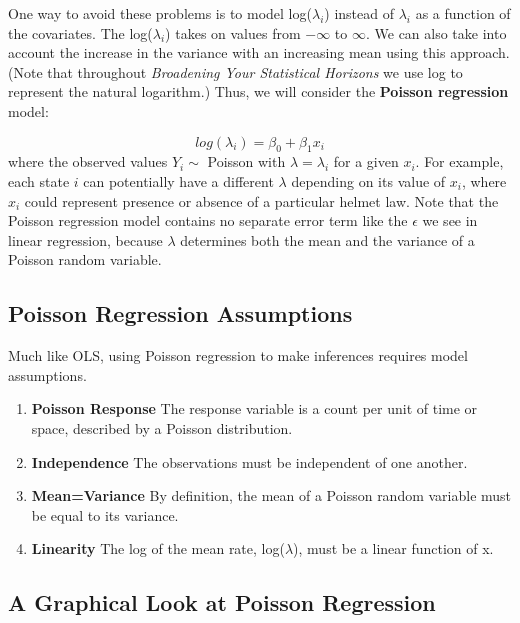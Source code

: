 \documentclass[
]{krantz}
\providecommand{\tightlist}{%
  \setlength{\itemsep}{0pt}\setlength{\parskip}{0pt}}
\begin{document}
One way to avoid these problems is to model log(\(\lambda_i\)) instead of \(\lambda_i\) as a function of the covariates. The log(\(\lambda_i\)) takes on values from \(-\infty\) to \(\infty\). We can also take into account the increase in the variance with an increasing mean using this approach. (Note that throughout \emph{Broadening Your Statistical Horizons} we use log to represent the natural logarithm.) Thus, we will consider the \textbf{Poisson regression} model:

\begin{equation}
log(\lambda_i)=\beta_0+\beta_1 x_i
\label{eq:poisReg}
\end{equation}
where the observed values \(Y_i \sim\) Poisson with \(\lambda=\lambda_i\) for a given \(x_i\). For example, each state \(i\) can potentially have a different \(\lambda\) depending on its value of \(x_i\), where \(x_i\) could represent presence or absence of a particular helmet law. Note that the Poisson regression model contains no separate error term like the \(\epsilon\) we see in linear regression, because \(\lambda\) determines both the mean and the variance of a Poisson random variable.

\hypertarget{poisson-regression-assumptions}{%
\subsection{Poisson Regression Assumptions}\label{poisson-regression-assumptions}}

Much like OLS, using Poisson regression to make inferences requires model assumptions.

\begin{enumerate}
\def\labelenumi{\arabic{enumi}.}
\tightlist
\item
  \textbf{Poisson Response} The response variable is a count per unit of time or space, described by a Poisson distribution.
\item
  \textbf{Independence} The observations must be independent of one another.
\item
  \textbf{Mean=Variance} By definition, the mean of a Poisson random variable must be equal to its variance.
\item
  \textbf{Linearity} The log of the mean rate, log(\(\lambda\)), must be a linear function of x.
\end{enumerate}

\hypertarget{a-graphical-look-at-poisson-regression}{%
\subsection{A Graphical Look at Poisson Regression}\label{a-graphical-look-at-poisson-regression}}
\end{document}
